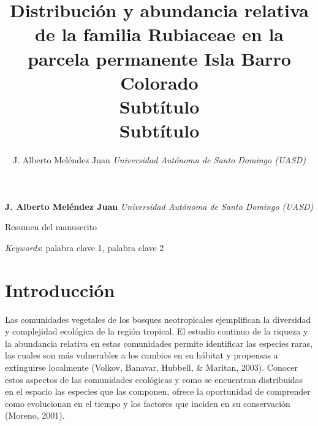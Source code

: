 \documentclass[11pt,]{article}
\title{Distribución y abundancia relativa de la familia Rubiaceae en la parcela
permanente Isla Barro Colorado\\
Subtítulo\\
Subtítulo  }
\author{\Large J. Alberto Meléndez Juan\vspace{0.05in} \newline\normalsize\emph{Universidad Autónoma de Santo Domingo (UASD)}  }
\date{}
\newcommand*{\authorfont}{\fontfamily{phv}\selectfont}
\renewenvironment{abstract}
 {{%
    \setlength{\leftmargin}{0mm}
    \setlength{\rightmargin}{\leftmargin}%
  }%
  \relax}
 {\endlist}
\begin{document}
	
%

{%
\setlength{\parindent}{0pt}
\thispagestyle{plain}
{\fontsize{18}{20}\selectfont\raggedright 
\maketitle  %

}

{
   \vskip 13.5pt\relax \normalsize\fontsize{11}{12} 
\textbf{\authorfont J. Alberto Meléndez Juan} \hskip 15pt \emph{\small Universidad Autónoma de Santo Domingo (UASD)}   

}

}








\begin{abstract}

    \hbox{\vrule height .2pt width 39.14pc}

    \vskip 8.5pt %

\noindent Resumen del manuscrito


\vskip 8.5pt \noindent \emph{Keywords}: palabra clave 1, palabra clave 2 \par

    \hbox{\vrule height .2pt width 39.14pc}



\end{abstract}


\vskip 6.5pt


\noindent  \section{Introducción}\label{introducciuxf3n}

Las comunidades vegetales de los bosques neotropicales ejemplifican la
diversidad y complejidad ecológica de la región tropical. El estudio
continuo de la riqueza y la abundancia relativa en estas comunidades
permite identificar las especies raras, las cuales son más vulnerables a
los cambios en su hábitat y propensas a extinguirse localmente (Volkov,
Banavar, Hubbell, \& Maritan, 2003). Conocer estos aspectos de las
comunidades ecológicas y como se encuentran distribuidas en el espacio
las especies que las componen, ofrece la oportunidad de comprender como
evolucionan en el tiempo y los factores que inciden en su conservación
(Moreno, 2001).
\end{document}
